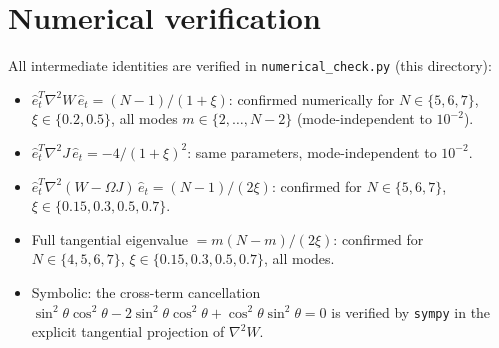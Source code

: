 \documentclass[11pt]{article}
\theoremstyle{remark}
\begin{document}
\section{Numerical verification}

All intermediate identities are verified in
\texttt{numerical\_check.py} (this directory):
\begin{itemize}
\item $\hat e_t^T\nabla^2 W\,\hat e_t = (N-1)/(1+\xi)$: confirmed
  numerically for $N \in \{5,6,7\}$, $\xi \in \{0.2, 0.5\}$, all
  modes $m \in \{2,\ldots,N-2\}$ (mode-independent to $10^{-2}$).
\item $\hat e_t^T\nabla^2 J\,\hat e_t = -4/(1+\xi)^2$: same
  parameters, mode-independent to $10^{-2}$.
\item $\hat e_t^T\nabla^2(W - \Omega J)\,\hat e_t = (N-1)/(2\xi)$:
  confirmed for $N \in \{5,6,7\}$, $\xi \in \{0.15, 0.3, 0.5, 0.7\}$.
\item Full tangential eigenvalue $= m(N-m)/(2\xi)$: confirmed for
  $N \in \{4,5,6,7\}$, $\xi \in \{0.15, 0.3, 0.5, 0.7\}$, all modes.
\item Symbolic: the cross-term cancellation
  $\sin^2\!\theta\cos^2\!\theta - 2\sin^2\!\theta\cos^2\!\theta
  + \cos^2\!\theta\sin^2\!\theta = 0$ is verified by \texttt{sympy}
  in the explicit tangential projection of $\nabla^2 W$.
\end{itemize}
\end{document}
